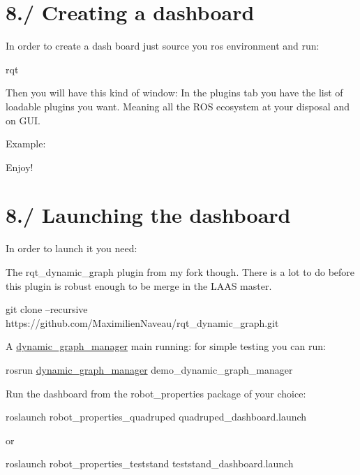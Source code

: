 \hypertarget{subpage_robot_dashboard_dashbaord_sec_create}{}\section{8./ Creating a dashboard}\label{subpage_robot_dashboard_dashbaord_sec_create}
In order to create a dash board just source you ros environment and run\+: 
\begin{DoxyCode}
rqt
\end{DoxyCode}
 Then you will have this kind of window\+:  In the plugins tab you have the list of loadable plugins you want. Meaning all the R\+OS ecosystem at your disposal and on G\+UI.

Example\+: 

Enjoy! \hypertarget{subpage_robot_dashboard_dashbaord_sec_launch}{}\section{8./ Launching the dashboard}\label{subpage_robot_dashboard_dashbaord_sec_launch}
In order to launch it you need\+:
\begin{DoxyItemize}
\item The rqt\+\_\+dynamic\+\_\+graph plugin from my fork though. There is a lot to do before this plugin is robust enough to be merge in the L\+A\+AS master. 
\begin{DoxyCode}
git clone --recursive https:\textcolor{comment}{//github.com/MaximilienNaveau/rqt\_dynamic\_graph.git}
\end{DoxyCode}

\item A \hyperlink{namespacedynamic__graph__manager}{dynamic\+\_\+graph\+\_\+manager} main running\+: for simple testing you can run\+: 
\begin{DoxyCode}
rosrun \hyperlink{namespacedynamic__graph__manager}{dynamic\_graph\_manager} demo\_dynamic\_graph\_manager
\end{DoxyCode}

\item Run the dashboard from the robot\+\_\+properties package of your choice\+: 
\begin{DoxyCode}
roslaunch robot\_properties\_quadruped quadruped\_dashboard.launch
\end{DoxyCode}
 or 
\begin{DoxyCode}
roslaunch robot\_properties\_teststand teststand\_dashboard.launch
\end{DoxyCode}
 
\end{DoxyItemize}